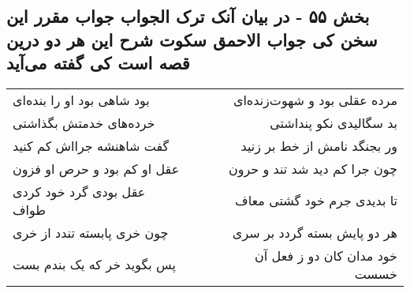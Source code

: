 \begin{center}
\section*{بخش ۵۵ - در بیان آنک ترک الجواب جواب مقرر این سخن کی جواب الاحمق سکوت شرح این هر دو درین قصه است کی  گفته می‌آید}
\label{sec:sh055}
\begin{longtable}{l p{0.5cm} r}
بود شاهی بود او را بنده‌ای
&&
مرده عقلی بود و شهوت‌زنده‌ای
\\
خرده‌های خدمتش بگذاشتی
&&
بد سگالیدی نکو پنداشتی
\\
گفت شاهنشه جرااش کم کنید
&&
ور بجنگد نامش از خط بر زنید
\\
عقل او کم بود و حرص او فزون
&&
چون جرا کم دید شد تند و حرون
\\
عقل بودی گرد خود کردی طواف
&&
تا بدیدی جرم خود گشتی معاف
\\
چون خری پابسته تندد از خری
&&
هر دو پایش بسته گردد بر سری
\\
پس بگوید خر که یک بندم بست
&&
خود مدان کان دو ز فعل آن خسست
\\
\end{longtable}
\end{center}
